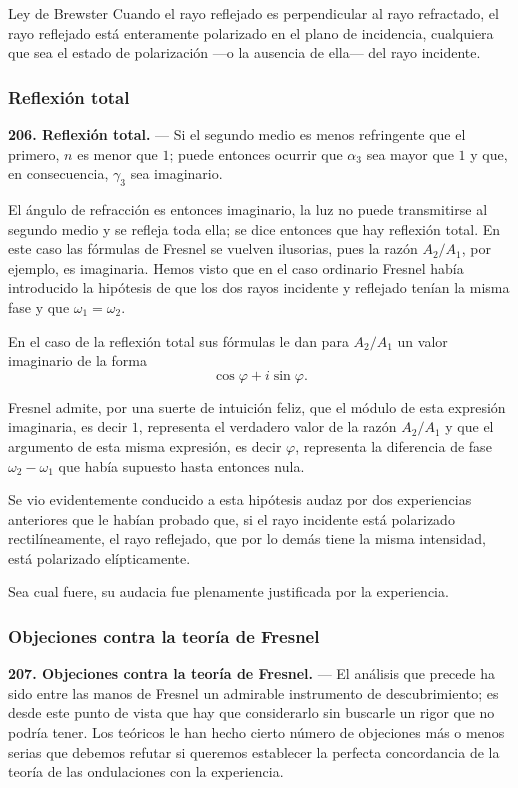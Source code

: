 \begin{enunciado}{Ley de Brewster}
Cuando el rayo reflejado es perpendicular al rayo refractado, el rayo
reflejado está enteramente polarizado en el plano de incidencia,
cualquiera que sea el estado de polarización —o la ausencia de ella— del
rayo incidente.
\end{enunciado}

\subsubsection{Reflexión total}

\noindent\textbf{206. Reflexión total.} — Si el segundo medio es menos
refringente que el primero, $n$ es menor que $1$; puede entonces ocurrir
que $\alpha_3$ sea mayor que $1$ y que, en consecuencia, $\gamma_3$ sea
imaginario.

El ángulo de refracción es entonces imaginario, la luz no puede
transmitirse al segundo medio y se refleja toda ella; se dice entonces que
hay reflexión total. En este caso las fórmulas de Fresnel se vuelven
ilusorias, pues la razón $A_2/A_1$, por ejemplo, es imaginaria. Hemos
visto que en el caso ordinario Fresnel había introducido la hipótesis de
que los dos rayos incidente y reflejado tenían la misma fase y que
$\omega_1=\omega_2$.

En el caso de la reflexión total sus fórmulas le dan para $A_2/A_1$ un
valor imaginario de la forma
\[
\cos\varphi+i\sin\varphi.
\]

Fresnel admite, por una suerte de intuición feliz, que el módulo de esta
expresión imaginaria, es decir $1$, representa el verdadero valor de la
razón $A_2/A_1$ y que el argumento de esta misma expresión, es decir
$\varphi$, representa la diferencia de fase $\omega_2-\omega_1$ que había
supuesto hasta entonces nula.

Se vio evidentemente conducido a esta hipótesis audaz por dos experiencias
anteriores que le habían probado que, si el rayo incidente está
polarizado rectilíneamente, el rayo reflejado, que por lo demás tiene la
misma intensidad, está polarizado elípticamente.

Sea cual fuere, su audacia fue plenamente justificada por la experiencia.

\subsubsection{Objeciones contra la teoría de Fresnel}

\noindent\textbf{207. Objeciones contra la teoría de Fresnel.} — El
análisis que precede ha sido entre las manos de Fresnel un admirable
instrumento de descubrimiento; es desde este punto de vista que hay que
considerarlo sin buscarle un rigor que no podría tener. Los teóricos le
han hecho cierto número de objeciones más o menos serias que debemos
refutar si queremos establecer la perfecta concordancia de la teoría de
las ondulaciones con la experiencia.

